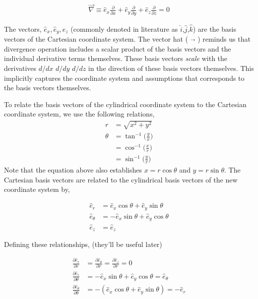 \documentclass[12pt]{article}
\begin{document}
\begin{align*}
\vec{\nabla} \equiv
\hat{e}_x \frac{\partial }{\partial x}  %
+ \hat{e}_y \frac{\partial }{\partial y}  %
	+ \hat{e}_z \frac{\partial }{\partial z}                      = 0
\label{Divergence_Operator}
\end{align*}

The vectors, $\hat{e}_x,\hat{e}_y,\hat{e}_z$ (commonly denoted in literature as $\hat{i}$,$\hat{j}$,$\hat{k}$) are the basis vectors of the Cartesian coordinate system. The vector hat ( $\vec{}$ ) reminds us that divergence operation includes a scalar product of  the basis vectors and the individual derivative terms themselves.
These basis vectors \textit{scale} with the derivatives $d/dx$ $d/dy$ $d/dz$ in the direction of these basis vectors themselves. This implicitly captures the coordinate system and assumptions that corresponds to the basis vectors themselves.

To relate the basis vectors of the cylindrical coordinate system to the Cartesian coordinate system, we use the following relations,
\begin{align*}
	r 
	&= \sqrt{x^2 + y^2} \\
	\theta 
	&= \tan^{-1} \Big( \frac{y}{x} \Big) \\
	&= \cos^{-1} \Big( \frac{x}{r} \Big) \\
	&=\sin^{-1} \Big( \frac{y}{r} \Big)		
\end{align*}
	Note that the equation above also establishes $x   = r\cos \theta$ and $y = r\sin\theta$. The Cartesian basis vectors are related to the cylindrical basis vectors of the new coordinate system by,

\begin{align*}
	\hat{e}_r 
	&= \hat{e}_x \cos \theta + \hat{e}_y \sin \theta \\
	\hat{e}_{\theta} 
	&= -\hat{e}_x \sin \theta + \hat{e}_y \cos \theta \\
	\hat{e}_z 	 
	&= \hat{e}_z %
\end{align*}

Defining these relationships, (they'll be useful later)

\begin{align*}
	\frac{\partial \hat{e}_{r	  }}{\partial r} 
	&= \frac{\partial \hat{e}_{\theta}}{\partial r} 
	= \frac{\partial \hat{e}_{z}	   }{\partial r} = 0 \\
	\frac{\partial \hat{e}_{r	  }}{\partial \theta} 
	&=	-\hat{e}_x \sin \theta + \hat{e}_y \cos \theta                = \hat{e}_{\theta}\\
	\frac{\partial \hat{e}_{\theta	  }}{\partial \theta}
	&= -\left(
	\hat{e}_x \cos \theta + \hat{e}_y \sin \theta
	\right) = 
	-\hat{e}_{r}
\end{align*}
\end{document}
